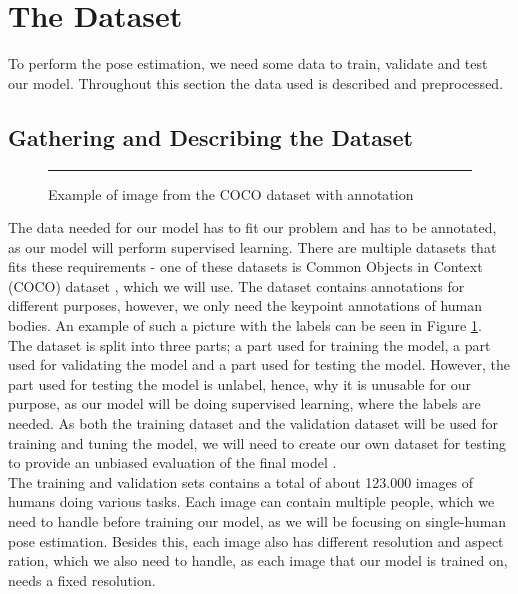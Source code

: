 \documentclass[main.tex]{subfiles}
\begin{document}
\section{The Dataset}
To perform the pose estimation, we need some data to train, validate and test our model. Throughout this section the data used is described and preprocessed.

\subsection{Gathering and Describing the Dataset}
\begin{figure}[H]
    \centering
    \rule{1cm}{1cm} %
    \caption{Example of image from the COCO dataset with annotation}
    \label{fig:coco_example}
\end{figure}
The data needed for our model has to fit our problem and has to be annotated, as our model will perform supervised learning. There are multiple datasets that fits these requirements - one of these datasets is Common Objects in Context (COCO) dataset \cite{COCO_article}, which we will use. The dataset contains annotations for different purposes, however, we only need the keypoint annotations of human bodies. An example of such a picture with the labels can be seen in Figure \ref{fig:coco_example}. \\
The dataset is split into three parts; a part used for training the model, a part used for validating the model and a part used for testing the model. However, the part used for testing the model is unlabel, hence, why it is unusable for our purpose, as our model will be doing supervised learning, where the labels are needed. As both the training dataset and the validation dataset will be used for training and tuning the model, we will need to create our own dataset for testing to provide an unbiased evaluation of the final model \cite{validation_vs_testing}. \\
The training and validation sets contains a total of about 123.000 images of humans doing various tasks. Each image can contain multiple people, which we need to handle before training our model, as we will be focusing on single-human pose estimation. Besides this, each image also has different resolution and aspect ration, which we also need to handle, as each image that our model is trained on, needs a fixed resolution. \\
\end{document}
